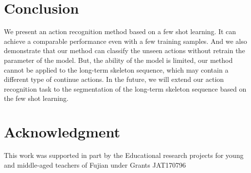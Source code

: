 \documentclass{bmvc2k}
\begin{document}
\section{Conclusion}
We present an action recognition method based on a few shot learning. It can achieve a comparable performance even with a few training samples. And we also demonstrate that our method can classify the unseen actions without retrain the parameter of the model. But, the ability of the model is limited, our method cannot be applied to the long-term skeleton sequence, which may contain a different type of continue actions. In the future, we will extend our action recognition task to the segmentation of the long-term skeleton sequence based on the few shot learning.

\section{Acknowledgment}
This work was supported in part by the Educational research projects for young and middle-aged teachers of Fujian under Grants JAT170796


%




\end{document}
